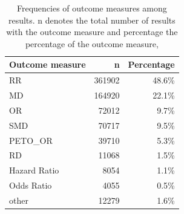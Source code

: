 \documentclass[11pt,a4paper,twoside]{book}\usepackage[]{graphicx}\usepackage[]{color}
\begin{document}
\begin{table}[ht]
\centering
\begingroup\footnotesize
\begin{tabular}{lrr}
  \hline
Outcome measure & n & Percentage \\ 
  \hline
RR & 361902 & 48.6\% \\ 
  MD & 164920 & 22.1\% \\ 
  OR & 72012 & 9.7\% \\ 
  SMD & 70717 & 9.5\% \\ 
  PETO\_OR & 39710 & 5.3\% \\ 
  RD & 11068 & 1.5\% \\ 
  Hazard Ratio & 8054 & 1.1\% \\ 
  Odds Ratio & 4055 & 0.5\% \\ 
  other & 12279 & 1.6\% \\ 
   \hline
\end{tabular}
\endgroup
\caption{Frequencies of outcome measures among results. n denotes the total number 
             of results with the outcome measure and percentage the percentage of the outcome measure,} 
\label{outcome.measure.frequencies}
\end{table}
\end{document}
